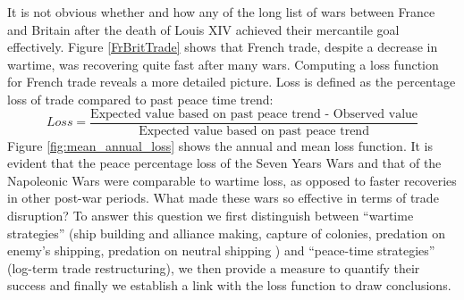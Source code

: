 \documentclass[12pt,a4paper,notitlepage,english]{article}
\begin{document}
It is not obvious whether and how any of the long list of wars between France and Britain after the death of Louis XIV achieved their mercantile goal effectively.
Figure \ref{FrBritTrade} shows that French trade, despite a decrease in wartime, was recovering quite fast after many wars.
Computing a loss function for French trade reveals a more detailed picture.
Loss is defined as the percentage loss of trade compared to past peace time trend:
\begin{equation*}
Loss = \frac{\text{Expected value based on past peace trend - Observed value}}{\text{Expected value based on past peace trend}}
\end{equation*}
Figure \ref{fig:mean_annual_loss} shows the annual and mean loss function.
It is evident that the peace percentage loss of the Seven Years Wars and that of the Napoleonic Wars were comparable to wartime loss, as opposed to faster recoveries in other post-war periods.
What made these wars so effective in terms of trade disruption?
To answer this question we first distinguish between ``wartime strategies'' (ship building and alliance making, capture of colonies, predation on enemy's shipping, predation on neutral shipping ) and ``peace-time strategies'' (log-term trade restructuring), we then provide a measure to quantify their success and finally we establish a link with the loss function to draw conclusions. 
\end{document}
